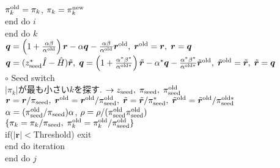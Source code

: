 \documentclass[12pt,titlepage]{jarticle}
\begin{document}
\\\hspace{2.0cm}
$\pi_k^{\rm old} = \pi_k$, $\pi_k = \pi_k^{\rm new}$
\\\hspace{1.5cm}
end do $i$
\\\hspace{1.0cm}
end do $k$
\\\hspace{1.0cm}
${\boldsymbol q} = \left( 1 + \frac{\alpha \beta}{\alpha^{\rm old}} \right) {\boldsymbol r}
- \alpha {\boldsymbol q} - \frac{\alpha \beta}{\alpha^{\rm old}} {\boldsymbol r}^{\rm old},\; 
{\boldsymbol r}^{\rm old} = {\boldsymbol r},\; {\boldsymbol r} = {\boldsymbol q}$
\\\hspace{1.0cm}
${\boldsymbol q} = (z_{\rm seed}^* {\hat I} - {\hat H}) {\tilde {\boldsymbol r}},\;
{\boldsymbol q} = \left( 1 + \frac{\alpha^* \beta^*}{\alpha^{{\rm old} *}} \right) {\tilde {\boldsymbol r}}
- \alpha^* {\boldsymbol q} - \frac{\alpha^* \beta^*}{\alpha^{{\rm old} *}} {\tilde {\boldsymbol r}}^{\rm old},\; 
{\tilde {\boldsymbol r}}^{\rm old} = {\tilde {\boldsymbol r}},\; {\tilde {\boldsymbol r}} = {\boldsymbol q}$
\\\hspace{1.0cm}
$\circ$ Seed switch
\\\hspace{1.0cm}
$|\pi_k|$が最も小さい$k$を探す. 
$\rightarrow z_{\rm seed},\; \pi_{\rm seed},\; \pi_{\rm seed}^{\rm old} $
\\\hspace{1.0cm}
${\boldsymbol r} = {\boldsymbol r} / \pi_{\rm seed},\; 
{\boldsymbol r}^{\rm old} = {\boldsymbol r}^{\rm old} / \pi_{\rm seed}^{\rm old},\; 
{\tilde {\boldsymbol r}} = {\tilde {\boldsymbol r}} / \pi_{\rm seed}^{ *},\; 
{\tilde {\boldsymbol r}}^{\rm old} = {\tilde {\boldsymbol r}}^{\rm old} / \pi_{\rm seed}^{{\rm old}*}$
\\\hspace{1.0cm}
$\alpha = (\pi_{\rm seed}^{\rm old} / \pi_{\rm seed}) \alpha$,
$\rho = \rho / (\pi_{\rm seed}^{\rm old} \pi_{\rm seed}^{\rm old})$
\\\hspace{1.0cm}
$\{\pi_k = \pi_k / \pi_{\rm seed},\; \pi_k^{\rm old} = \pi_k^{\rm old} / \pi_{\rm seed}^{\rm old}\}$
\\\hspace{1.0cm}
if($|{\boldsymbol r}| < $Threshold) exit
\\\hspace{0.5cm}
end do iteration
\\
end do $j$
\end{document}
